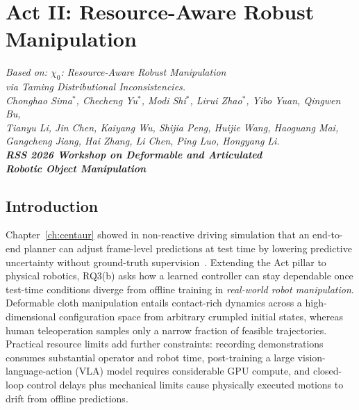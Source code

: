 \chapter{Act II: Resource-Aware Robust Manipulation}\label{ch:kai0}
\begin{flushright}
\itshape
Based on: $\chi_{0}$: Resource-Aware Robust Manipulation\\
via Taming Distributional Inconsistencies.\\
Chonghao Sima$^{*}$, Checheng Yu$^{*}$, Modi Shi$^{*}$, Lirui Zhao$^{*}$, Yibo Yuan, Qingwen Bu,\\
Tianyu Li, Jin Chen, Kaiyang Wu, Shijia Peng, Huijie Wang, Haoguang Mai,\\
Gangcheng Jiang, Hai Zhang, Li Chen, Ping Luo, Hongyang Li.\\
\textbf{RSS 2026 Workshop on Deformable and Articulated}\\
\textbf{Robotic Object Manipulation} 
\end{flushright}
\vspace{0.6em}

\section{Introduction}\label{kai0:sec:intro}

Chapter~\ref{ch:centaur} showed in non-reactive driving simulation that an end-to-end planner can adjust frame-level predictions at test time by lowering predictive uncertainty without ground-truth supervision~\cite{sima2024centaur}. Extending the Act pillar to physical robotics, RQ3(b) asks how a learned controller can stay dependable once test-time conditions diverge from offline training in \emph{real-world robot manipulation}. Deformable cloth manipulation entails contact-rich dynamics across a high-dimensional configuration space from arbitrary crumpled initial states, whereas human teleoperation samples only a narrow fraction of feasible trajectories. Practical resource limits add further constraints: recording demonstrations consumes substantial operator and robot time, post-training a large vision-language-action (VLA) model requires considerable GPU compute, and closed-loop control delays plus mechanical limits cause physically executed motions to drift from offline predictions.

